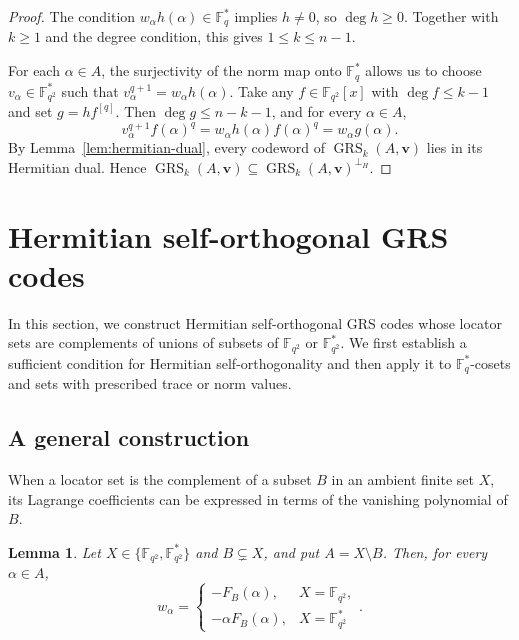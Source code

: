 \documentclass[preprint,12pt,a4paper]{elsarticle}
\newtheorem{lemma}[theorem]{Lemma}
\newcommand{\GRS}{\operatorname{GRS}}
\begin{document}
\begin{proof}
The condition $w_\alpha h(\alpha)\in\mathbb F_q^{*}$ implies $h\ne0$, so $\deg h\ge0$. Together with $k\ge1$ and the degree condition, this gives $1\le k\le n-1$.

For each $\alpha \in A$, the surjectivity of the norm map onto $\mathbb F_q^{*}$ allows us to choose $v_\alpha \in \mathbb F_{q^2}^{*}$ such that $v_\alpha^{q+1}=w_\alpha h(\alpha)$. Take any $f\in\mathbb F_{q^2}[x]$ with $\deg f\le k-1$ and set $g=hf^{[q]}$. Then $\deg g\le n-k-1$, and for every $\alpha\in A$,
\[
 v_\alpha^{q+1}f(\alpha)^q
 =w_\alpha h(\alpha)f(\alpha)^q=w_\alpha g(\alpha).
\]
By Lemma~\ref{lem:hermitian-dual}, every codeword of $\GRS_k(A,\boldsymbol v)$ lies in its Hermitian dual. Hence $\GRS_k(A,\boldsymbol v)\subseteq\GRS_k(A,\boldsymbol v)^{\perp_H}$.
\end{proof}

\section{Hermitian self-orthogonal GRS codes}\label{sec:classical}\label{sec:general}\label{sec:families}

In this section, we construct Hermitian self-orthogonal GRS codes whose locator sets are complements of unions of subsets of $\mathbb F_{q^2}$ or $\mathbb F_{q^2}^{*}$. We first establish a sufficient condition for Hermitian self-orthogonality and then apply it to $\mathbb F_q^{*}$-cosets and sets with prescribed trace or norm values.

\subsection{A general construction}

When a locator set is the complement of a subset $B$ in an ambient finite set $X$, its Lagrange coefficients can be expressed in terms of the vanishing polynomial of $B$.

\begin{lemma}\label{lem:complement-coefficients}
Let $X\in\{\mathbb F_{q^2},\mathbb F_{q^2}^{*}\}$ and $B\subsetneq X$, and put $A=X\setminus B$. Then, for every $\alpha\in A$,
\[
 w_\alpha=
 \begin{cases}
 -F_B(\alpha),&X=\mathbb F_{q^2},\\
 -\alpha F_B(\alpha),&X=\mathbb F_{q^2}^{*}
 \end{cases}.
\]
\end{lemma}
\end{document}
